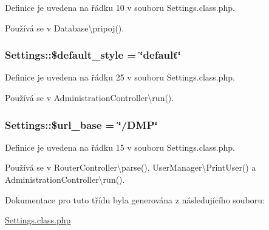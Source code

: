Definice je uvedena na řádku 10 v souboru Settings.\-class.\-php.



Používá se v Database\textbackslash{}pripoj().

\hypertarget{class_settings_a0fa5d232ec562cfdd51abcb478096a62}{
\subsubsection[{\$default\-\_\-style}]{\setlength{\rightskip}{0pt plus 5cm}Settings\-::\$default\-\_\-style = \char`\"{}default\char`\"{}\hspace{0.3cm}{\ttfamily [static]}}}\label{class_settings_a0fa5d232ec562cfdd51abcb478096a62}


Definice je uvedena na řádku 25 v souboru Settings.\-class.\-php.



Používá se v Administration\-Controller\textbackslash{}run().

\hypertarget{class_settings_ab4d5556c37e88ee59e06e8c409e8bcd1}{
\subsubsection[{\$url\-\_\-base}]{\setlength{\rightskip}{0pt plus 5cm}Settings\-::\$url\-\_\-base = \char`\"{}/D\-M\-P\char`\"{}\hspace{0.3cm}{\ttfamily [static]}}}\label{class_settings_ab4d5556c37e88ee59e06e8c409e8bcd1}


Definice je uvedena na řádku 15 v souboru Settings.\-class.\-php.



Používá se v Router\-Controller\textbackslash{}parse(), User\-Manager\textbackslash{}\-Print\-User() a Administration\-Controller\textbackslash{}run().



Dokumentace pro tuto třídu byla generována z následujícího souboru\-:\begin{DoxyCompactItemize}
\item 
\hyperlink{_settings_8class_8php}{Settings.\-class.\-php}\end{DoxyCompactItemize}
